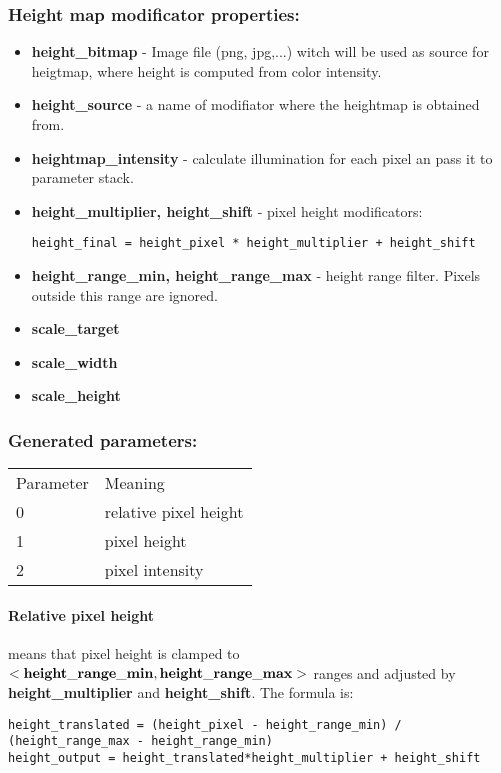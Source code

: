 \documentclass[9pt]{article}
\begin{document}
\subsubsection*{Height map modificator properties:}
\begin{itemize}
\item{\bf height\_bitmap} - Image file (png, jpg,...) witch will be used as 
source for heigtmap, where height is computed from color intensity.
\item{\bf height\_source} - a name of modifiator where the heightmap is obtained from.
\item{\bf heightmap\_intensity} - calculate illumination for each pixel an pass it
to parameter stack.
\item{\bf height\_multiplier, height\_shift} - pixel height modificators:
\begin{verbatim}
height_final = height_pixel * height_multiplier + height_shift
\end{verbatim}
\item{\bf height\_range\_min, height\_range\_max} - height range filter. Pixels
outside this range are ignored.
\item{\bf scale\_target}
\item{\bf scale\_width}
\item{\bf scale\_height}
\end{itemize}

\subsubsection*{Generated parameters:}
\begin{tabular}{|l||l|}
  Parameter & Meaning \\
  0 & relative pixel height \\
  1 & pixel height \\
  2 & pixel intensity \\
\end{tabular}

\paragraph*{Relative pixel height}
means that pixel height is clamped to \begin{math}{\bf<height\_range\_min, height\_range\_max>}\end{math}
ranges and adjusted by {\bf height\_multiplier} and {\bf height\_shift}.
The formula is:
\begin{verbatim}
height_translated = (height_pixel - height_range_min) / (height_range_max - height_range_min)
height_output = height_translated*height_multiplier + height_shift
\end{verbatim}
\end{document}
